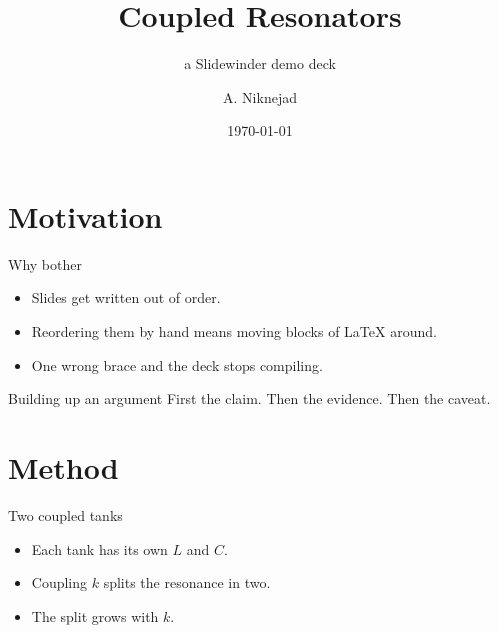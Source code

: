 \documentclass{beamer}
\title{Coupled Resonators}
\subtitle{a Slidewinder demo deck}
\author{A. Niknejad}
\date{\today}
\begin{document}
\begin{frame}
  \titlepage
\end{frame}

\section{Motivation}

\begin{frame}{Why bother}
  \begin{itemize}
    \item Slides get written out of order.
    \item Reordering them by hand means moving blocks of \LaTeX{} around.
    \item One wrong brace and the deck stops compiling.
  \end{itemize}
\end{frame}

\begin{frame}{Building up an argument}
  First the claim.
  \pause
  Then the evidence.
  \pause
  Then the caveat.
\end{frame}

\section{Method}

\begin{frame}{Two coupled tanks}
  \begin{itemize}
    \item<1-> Each tank has its own $L$ and $C$.
    \item<2-> Coupling $k$ splits the resonance in two.
    \item<3-> The split grows with $k$.
  \end{itemize}
\end{frame}
\end{document}
